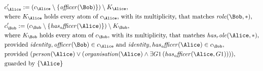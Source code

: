 \begin{align*}
&
c'_
{
\Alice
}
 := 
(c_
{
\Alice
}
 \setminus 
\{
\mathit{
officer
}
(
\Bob
)
\}
) \setminus K_
{
\Alice
}
,\\
&
\text{where } K_
{
\Alice
}
 \text{ holds every atom of } c_
{
\Alice
}
 \text{, with its multiplicity, that matches } 
\mathit{
role
}
(
\Bob
,
\ast
)
,\\
&
c'_
{
\Bob
}
 := 
(c_
{
\Bob
}
 \setminus 
\{
\mathit{
has_officer
}
(
\Alice
)
\}
) \setminus K_
{
\Bob
}
,\\
&
\text{where } K_
{
\Bob
}
 \text{ holds every atom of } c_
{
\Bob
}
 \text{, with its multiplicity, that matches } 
\mathit{
has_role
}
(
\Alice
,
\ast
)
,\\
&
\text{provided } 
\mathit{
identity
}
,
\mathit{
officer
}
(
\Bob
)
 \in c_
{
\Alice
}
 \text{ and } 
\mathit{
identity
}
,
\mathit{
has_officer
}
(
\Alice
)
 \in c_
{
\Bob
}
,\\
&
\text{provided } 
(
\mathit{
person
}
(
\Alice
)
\lor
(
\mathit{
organisation
}
(
\Alice
)
\land
\exists 
G1
\,(
\mathit{
has_officer
}
(
\Alice
,
G1
)
)
)
)
,\\
&
\text{guarded by } \{
\Alice
\}
\end{align*}

